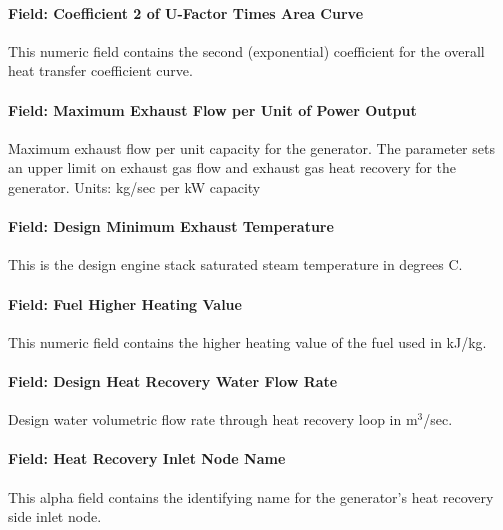 \paragraph{Field: Coefficient 2 of U-Factor Times Area Curve}\label{field-coefficient-2-of-u-factor-times-area-curve}

This numeric field contains the second (exponential) coefficient for the overall heat transfer coefficient curve.

\paragraph{Field: Maximum Exhaust Flow per Unit of Power Output}\label{field-maximum-exhaust-flow-per-unit-of-power-output}

Maximum exhaust flow per unit capacity for the generator. The parameter sets an upper limit on exhaust gas flow and exhaust gas heat recovery for the generator. Units: kg/sec per kW capacity

\paragraph{Field: Design Minimum Exhaust Temperature}\label{field-design-minimum-exhaust-temperature}

This is the design engine stack saturated steam temperature in degrees C.

\paragraph{Field: Fuel Higher Heating Value}\label{field-fuel-higher-heating-value}

This numeric field contains the higher heating value of the fuel used in kJ/kg.

\paragraph{Field: Design Heat Recovery Water Flow Rate}\label{field-design-heat-recovery-water-flow-rate}

Design water volumetric flow rate through heat recovery loop in m\(^{3}\)/sec.

\paragraph{Field: Heat Recovery Inlet Node Name}\label{field-heat-recovery-inlet-node-name}

This alpha field contains the identifying name for the generator's heat recovery side inlet node.

